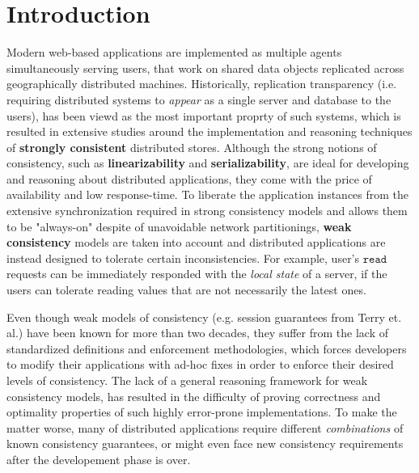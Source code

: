 \section{Introduction}

Modern web-based applications are implemented as multiple
agents simultaneously serving users, that work on shared data
objects replicated across geographically distributed machines. 
Historically, replication transparency (i.e. requiring distributed
systems to \emph{appear} as a single server and database to the users), has been viewd as the most
important proprty of such systems, which is resulted in extensive
studies around the implementation and reasoning techniques of {\bf
strongly consistent} distributed stores. Although the strong notions of
consistency, such as {\bf linearizability} and {\bf serializability}, 
are ideal for developing and reasoning about distributed applications, they
come with the price of availability and low response-time. 
To liberate the application instances from the extensive
synchronization required in strong consistency models and allows 
them to be "always-on" despite of unavoidable
network partitionings, {\bf weak consistency} models are taken into
account and distributed applications are instead designed to
tolerate certain inconsistencies. For example, user's $\mathtt{read}$ requests can
be immediately responded with the \emph{local state} of a server, if the users
can tolerate reading values that are not necessarily the latest ones.

Even though weak models of consistency (e.g. session guarantees from
Terry et. al.) have been known for more than two decades, they suffer 
from the lack of standardized definitions and enforcement
methodologies, which forces developers to modify their applications
with ad-hoc fixes in order to enforce their desired levels of
consistency. The lack of a
general reasoning framework for weak consistency models, has resulted in the
difficulty of proving correctness and optimality properties of such
highly error-prone implementations. To make the matter worse, many of
distributed applications require different \emph{combinations} of known
consistency guarantees, or might even face new consistency requirements
after the developement phase is over.

